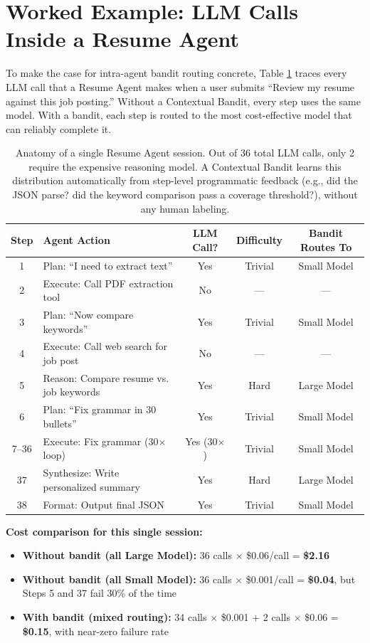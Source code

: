 \documentclass[12pt,a4paper]{article}
\begin{document}
\appendix
\section{Worked Example: LLM Calls Inside a Resume Agent}
\label{app:resume_walkthrough}

To make the case for intra-agent bandit routing concrete, Table \ref{tab:resume_agent} traces every LLM call that a Resume Agent makes when a user submits ``Review my resume against this job posting.'' Without a Contextual Bandit, every step uses the same model. With a bandit, each step is routed to the most cost-effective model that can reliably complete it.

\begin{table}[h]
\centering
\small
\begin{tabular}{@{}clccc@{}}
\toprule
\textbf{Step} & \textbf{Agent Action} & \textbf{LLM Call?} & \textbf{Difficulty} & \textbf{Bandit Routes To} \\
\midrule
1 & Plan: ``I need to extract text'' & Yes & Trivial & Small Model \\
2 & Execute: Call PDF extraction tool & No & --- & --- \\
3 & Plan: ``Now compare keywords'' & Yes & Trivial & Small Model \\
4 & Execute: Call web search for job post & No & --- & --- \\
5 & Reason: Compare resume vs. job keywords & Yes & Hard & Large Model \\
6 & Plan: ``Fix grammar in 30 bullets'' & Yes & Trivial & Small Model \\
7--36 & Execute: Fix grammar (30$\times$ loop) & Yes (30$\times$) & Trivial & Small Model \\
37 & Synthesize: Write personalized summary & Yes & Hard & Large Model \\
38 & Format: Output final JSON & Yes & Trivial & Small Model \\
\bottomrule
\end{tabular}
\caption{Anatomy of a single Resume Agent session. Out of 36 total LLM calls, only 2 require the expensive reasoning model. A Contextual Bandit learns this distribution automatically from step-level programmatic feedback (e.g., did the JSON parse? did the keyword comparison pass a coverage threshold?), without any human labeling.}
\label{tab:resume_agent}
\end{table}

\noindent \textbf{Cost comparison for this single session:}
\begin{itemize}
    \item \textbf{Without bandit (all Large Model):} 36 calls $\times$ \$0.06/call = \textbf{\$2.16}
    \item \textbf{Without bandit (all Small Model):} 36 calls $\times$ \$0.001/call = \textbf{\$0.04}, but Steps 5 and 37 fail 30\% of the time
    \item \textbf{With bandit (mixed routing):} 34 calls $\times$ \$0.001 + 2 calls $\times$ \$0.06 = \textbf{\$0.15}, with near-zero failure rate
\end{itemize}
\end{document}
